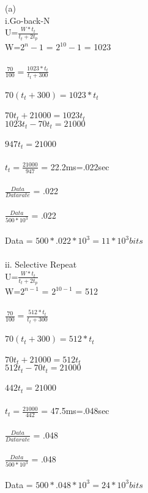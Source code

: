 \documentclass[a4paper,12pt]{article}
\begin{document}
(a)\\
i.Go-back-N\\
U=$\frac{W*t_{t}}{t_{t}+2t_{p}}$\\
W=$2^n-{1}$ = $2^{10}-1$ = 1023\\\\
$\frac{70}{100} = \frac{1023 * t_{t}}{t_{t}+300}$\\\\
$70(t_{t}+300)=1023* t_{t}$\\\\
$70t_{t} + 21000 = 1023t_{t}$\\
$1023t_{t}-70t_{t} = 21000$\\\\
$947t_{t}=21000$\\\\
$t_{t} = \frac{21000}{947}$ = 22.2ms=.022sec\\\\
$\frac{Data}{Datarate}$ = .022\\\\
$\frac{Data}{500*10^3}$ = .022\\\\
Data = $500*.022*10^3= 11 * 10^3 bits$\\\\

ii. Selective Repeat\\
U=$\frac{W*t_{t}}{t_{t}+2t_{p}}$\\
W=$2^{n-1}$ = $2^{10-1}$ = 512\\\\
$\frac{70}{100} = \frac{512 * t_{t}}{t_{t}+300}$\\\\
$70(t_{t}+300)=512* t_{t}$\\\\
$70t_{t} + 21000 = 512t_{t}$\\
$512t_{t}-70t_{t} = 21000$\\\\
$442t_{t}=21000$\\\\
$t_{t} = \frac{21000}{442}$ = 47.5ms=.048sec\\\\
$\frac{Data}{Datarate}$ = .048\\\\
$\frac{Data}{500*10^3}$ = .048\\\\
Data = $500*.048*10^3= 24 * 10^3 bits$\\\\
\end{document}
